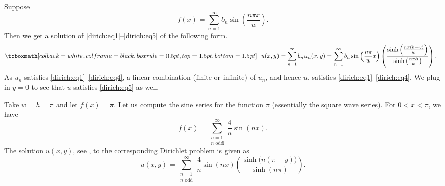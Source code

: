 Suppose
\begin{equation*}
f(x) =
\sum_{n=1}^\infty
b_n \sin \left( \frac{n \pi x }{w} \right) .
\end{equation*}
Then we get a solution of \eqref{dirich:eq1}--\eqref{dirich:eq5} of the
following form.
\begin{equation*}
\mybxbg{
~~
u(x,y) =
\sum_{n=1}^\infty
b_n u_n(x,y)
=
\sum_{n=1}^\infty
b_n 
\sin \left( \frac{n \pi}{w} x \right)
\left( \frac{\sinh \left( \frac{n \pi (h-y) }{w} \right)}%
{\sinh \left( \frac{n \pi h }{w} \right)} \right)
.
~~
}
\avoidbreak
\end{equation*}
As $u_n$ satisfies \eqref{dirich:eq1}--\eqref{dirich:eq4}, a linear
combination (finite or infinite) of $u_n$, and hence $u$, satisfies 
\eqref{dirich:eq1}--\eqref{dirich:eq4}. 
We plug in $y=0$ to see that $u$
satisfies 
\eqref{dirich:eq5} as well.

\begin{example}
Take $w=h=\pi$ and let $f(x) = \pi$.  Let us compute the sine
series for the function $\pi$ (essentially the square wave series).
For $0 < x < \pi$, we have
\begin{equation*}
f(x) =
\sum_{\substack{n=1 \\ n \text{ odd}}}^\infty
\frac{4}{n}
\sin (n x) .
\end{equation*}
The solution $u(x,y)$, see ,
to the corresponding Dirichlet problem is
given as
\begin{equation*}
u(x,y) =
\sum_{\substack{n=1 \\ n \text{ odd}}}^\infty
\frac{4}{n}
\sin (n x)
\left( \frac{\sinh \bigl( n (\pi-y) \bigr) }{\sinh (n \pi)} \right)
.
\end{equation*}

\begin{myfig}
\capstart
{}
\caption{Steady-state temperature of a square plate, three sides
held at zero and one side held at $\pi$.\label{dirichsquareplot:fig}}
\end{myfig}
\end{example}

